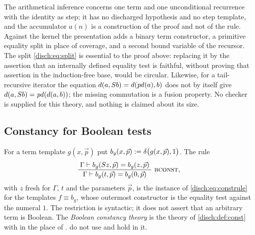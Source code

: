 \begin{remark}
\label{disch:rem:const}
The arithmetical inference concerns one term and one unconditional
recurrence with the identity as step; it has no discharged hypothesis and
no step template, and the accumulator $a(n)$ is a construction of the
proof and not of the rule. Against the kernel the presentation adds a
binary term constructor, a primitive equality split in place of coverage,
and a second bound variable of the recursor. The split
\eqref{disch:eq:split} is essential to the proof above: replacing it by
the assertion that an internally defined equality test is faithful,
without proving that assertion in the induction-free base, would be
circular. Likewise, for a tail-recursive iterator the equation
$d(a,S b)=d(\mathit{pd}(a),b)$ does not by itself give
$d(a,S b)=\mathit{pd}(d(a,b))$; the missing commutation is a fusion
property. No checker is supplied for this theory, and nothing is claimed
about its size.
\end{remark}

\subsection{Constancy for Boolean tests}
\label{disch:sec:const-bool}

For a term template $g(x,\vec p)$ put
$b_g(x,\vec p)\mathrel{:=}\delta\bigl(g(x,\vec p),1\bigr)$. The rule
\begin{equation}
 \infrule{\Gamma\proves b_g(\Suc z,\vec p)=b_g(z,\vec p)}
         {\Gamma\proves b_g(t,\vec p)=b_g(0,\vec p)}\ \rulename{BConst},
 \label{disch:eq:bconst}
\end{equation}
with $z$ fresh for $\Gamma$, $t$ and the parameters $\vec p$, is the
instance of  \eqref{disch:eq:construle} for the templates
$f\equiv b_g$, whose outermost constructor is the equality test against the
numeral $1$. The restriction is syntactic; it does not assert that an
arbitrary term is Boolean. The \emph{Boolean constancy theory} is the
theory of \cref{disch:def:const} with  in the place of
.  do not
use  and hold in it.

